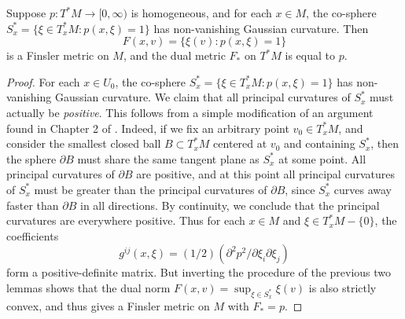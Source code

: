 \begin{lemma}
  Suppose $p: T^* M \to [0,\infty)$ is homogeneous, and for each $x \in M$, the co-sphere $S_x^* = \{ \xi \in T_x^* M : p(x,\xi) = 1 \}$ has non-vanishing Gaussian curvature. Then
  \[ F(x,v) = \{ \xi(v) : p(x,\xi) = 1 \} \]
  is a Finsler metric on $M$, and the dual metric $F_*$ on $T^*M$ is equal to $p$.
\end{lemma}
\begin{proof}
  For each $x \in U_0$, the co-sphere $S_x^* = \{ \xi \in T_x^* M : p(x,\xi) = 1 \}$ has non-vanishing Gaussian curvature. We claim that all principal curvatures of $S_x^*$ must actually be \emph{positive}. This follows from a simple modification of an argument found in Chapter 2 of \cite{HeinzHopf}. Indeed, if we fix an arbitrary point $v_0 \in T_x^*M$, and consider the smallest closed ball $B \subset T_x^* M$ centered at $v_0$ and containing $S_x^*$, then the sphere $\partial B$ must share the same tangent plane as $S_x^*$ at some point. All principal curvatures of $\partial B$ are positive, and at this point all principal curvatures of $S_x^*$ must be greater than the principal curvatures of $\partial B$, since $S_x^*$ curves away faster than $\partial B$ in all directions. By continuity, we conclude that the principal curvatures are everywhere positive.  Thus for each $x \in M$ and $\xi \in T_x^* M - \{ 0 \}$, the coefficients
  \begin{equation}
    g^{ij}(x,\xi) = (1/2) (\partial^2 p^2 / \partial \xi_i \partial \xi_j)
  \end{equation}
  form a positive-definite matrix. But inverting the procedure of the previous two lemmas shows that the dual norm $F(x,v) = \sup\nolimits_{\xi \in S_x^*} \xi(v)$ is also strictly convex, and thus gives a Finsler metric on $M$ with $F_* = p$. %
\end{proof}

%


